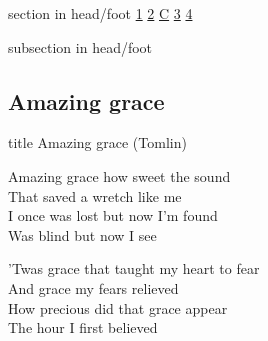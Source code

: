 \documentclass{beamer}
\begin{document}
{
{ 
 {
 \begin{beamercolorbox}[ht=4.5ex,dp=1.5ex,%
      leftskip=.3cm,rightskip=.3cm plus1fil]{section in head/foot}
 \fontsize{12}{25}\selectfont 
\hyperlink{Amazing grace['My chains are gone'](Tomlin)1}{1}
\hyperlink{Amazing grace['My chains are gone'](Tomlin)2}{2}
\hyperlink{Amazing grace['My chains are gone'](Tomlin)C}{C}
\hyperlink{Amazing grace['My chains are gone'](Tomlin)3}{3}
\hyperlink{Amazing grace['My chains are gone'](Tomlin)4}{4}
 
 \end{beamercolorbox}%
  \begin{beamercolorbox}[ht=2.5ex,dp=1.125ex,%
   leftskip=.3cm,rightskip=.3cm plus1fil]{subsection in head/foot}
   \insertauthor
 \end{beamercolorbox}%
 }
}
\subsection{ Amazing grace }

\hypertarget{Amazing grace['My chains are gone'](Tomlin)}{}
\begin{frame}{}
 \vfill
  \centering
  \begin{beamercolorbox}[sep=8pt,center,shadow=true,rounded=true]{title}
    Amazing grace (Tomlin)    
  \end{beamercolorbox}
  \vfill
\end{frame}

\hypertarget{Amazing grace['My chains are gone'](Tomlin)1}{}
\begin{frame}{}
\fontsize{ 18 }{ 23 }\selectfont

Amazing grace how sweet the sound\\ 
That saved a wretch like me\\ 
I once was lost but now I'm found\\ 
Was blind but now I see 

\end{frame}

\hypertarget{Amazing grace['My chains are gone'](Tomlin)2}{}
\begin{frame}{}
\fontsize{ 18 }{ 23 }\selectfont

'Twas grace that taught my heart to fear\\ 
And grace my fears relieved\\ 
How precious did that grace appear\\ 
The hour I first believed 


\end{frame}}
\end{document}
